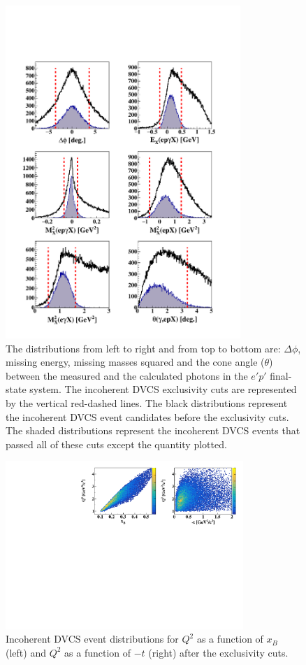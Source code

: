 \documentclass[twocolumn,nofootinbib,prl,superscriptaddress,secnumarabic,amssymb,nobibnotes,aps,floatfix]{revtex4}
\begin{document}
\begin{figure}[tb]
\includegraphics[width=8.9cm]{figs/incoh_exc_cuts_final.pdf}
\caption{The distributions from left to right and from top to bottom are: 
   $\Delta \phi$, missing energy, missing masses squared and the cone angle 
   ($\theta$) between the measured and the calculated photons in the $e'p'$ 
   final-state system. The incoherent DVCS exclusivity cuts are represented by 
   the vertical red-dashed lines. The black distributions represent the 
   incoherent DVCS event candidates before the exclusivity cuts. The shaded 
   distributions represent the incoherent DVCS events that passed all of these 
   cuts except the quantity plotted.}
\label{fig:kin-cuts}

\end{figure}
\begin{figure}[h!]
\hspace{-0.45cm}
\includegraphics[width=9.0cm]{figs/Q2_xB_t_InCoh.pdf}
\caption{Incoherent DVCS event distributions for $Q^{2}$ as a function of 
$x_{B}$ (left) and $Q^{2}$ as a function of $-t$ (right) after the exclusivity 
cuts.}
\label{fig:kin-coverage}
\end{figure}
\end{document}
